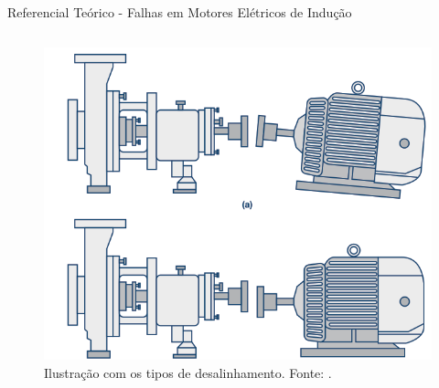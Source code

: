 \documentclass[aspectratio=169]{beamer}
\begin{document}

\begin{frame}{Referencial Teórico - Falhas em Motores Elétricos de Indução}
	\begin{columns}
    	\begin{column}{0.50\textwidth}
			\begin{figure}[HT]
				\begin{center}
					\captionsetup{justification=justified}
					\includegraphics[scale=.25]{../referencial/img/misadraw_analog_p2.png}
					\caption{Ilustração com os tipos de desalinhamento. \newline
					Fonte: .} 
					\label{fig:misadraw_analog_p2}
				\end{center}
			\end{figure}
     	\end{column}
		

\end{columns}
\end{frame}
\end{document}

